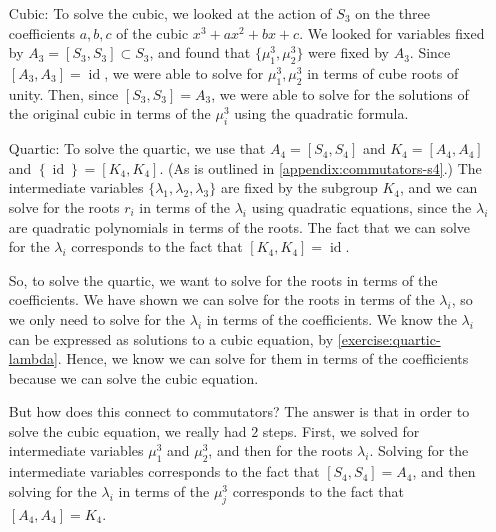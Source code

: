 \documentclass[reqno, 12pt, letter]{article}
\theoremstyle{plain}
\theoremstyle{definition}
\theoremstyle{remark}
\numberwithin{equation}{section}
\DeclareMathOperator\id{id}
\begin{document}
		\begin{enumerate}
			\item[Cubic:] To solve the cubic, we looked at the action of $S_3$ on the three coefficients $a,b,c$ of the cubic $x^3 + ax^2 + bx+c$. 
				We looked for variables fixed by $A_3 = \left[ S_3, S_3 \right] \subset S_3$,
				and found that $\{\mu_1^3, \mu_2^3 \}$ were fixed by $A_3$.
				Since $\left[ A_3, A_3 \right]= \id$, we were able to solve for $\mu_1^3, \mu_2^3$ in terms of cube roots of unity.
				Then, since $\left[ S_3, S_3 \right]=A_3$,
				we were able to solve for the solutions of the original cubic in terms of the $\mu_i^3$ using the quadratic formula.
			\item[Quartic:]	
				To solve the quartic, we use that $A_4 = \left[ S_4, S_4 \right]$ and $K_4 = \left[ A_4, A_4 \right]$ and
				$\left\{ \id \right\}= \left[ K_4, K_4 \right]$.
				(As is outlined in \autoref{appendix:commutators-s4}.)
				The intermediate variables $ \{\lambda_1, \lambda_2, \lambda_3 \}$ are fixed by the subgroup $K_4$,
				and 
				we can solve for the roots $r_i$ in terms of the $\lambda_i$
				using quadratic equations, since the $\lambda_i$ are quadratic polynomials in terms of the roots.
				The fact that we can solve for the $\lambda_i$ corresponds to the fact that $\left[ K_4, K_4 \right] = \id$.

				So, to solve the quartic, we want to solve for the roots in terms of the coefficients.
				We have shown we can solve for the roots in terms of the $\lambda_i$, so we only need to solve
				for the $\lambda_i$ in terms of the coefficients.
				We know the $\lambda_i$ can be expressed as solutions to a cubic equation, by \autoref{exercise:quartic-lambda}.
				Hence, we know we can solve for them in terms of the coefficients because we can solve the cubic equation.

				But how does this connect to commutators?
				The answer is that in order to solve the cubic equation, we really had $2$ steps.
				First, we solved for intermediate variables
				$\mu_1^3$ and $\mu_2^3$, and then for the roots $\lambda_i$.
				Solving for the intermediate variables corresponds to the fact that $\left[ S_4, S_4 \right] = A_4$,
				and then solving for the $\lambda_i$ in terms of the $\mu_j^3$ corresponds to the fact that
				$\left[ A_4, A_4 \right] = K_4$.
		\end{enumerate}
		
\end{document}
